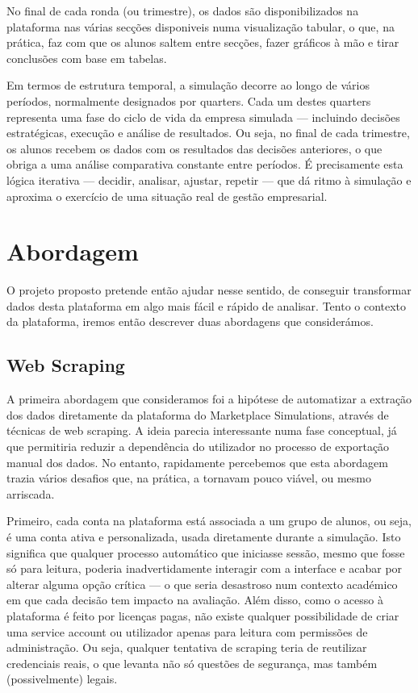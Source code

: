 No final de cada ronda (ou trimestre), os dados são disponibilizados na plataforma nas várias secções disponiveis numa visualização tabular, o que, na prática, faz com que os alunos saltem entre secções, fazer gráficos à mão e tirar conclusões com base em tabelas.

Em termos de estrutura temporal, a simulação decorre ao longo de vários períodos, normalmente designados por quarters. Cada um destes quarters representa uma fase do ciclo de vida da empresa simulada — incluindo decisões estratégicas, execução e análise de resultados. Ou seja, no final de cada trimestre, os alunos recebem os dados com os resultados das decisões anteriores, o que obriga a uma análise comparativa constante entre períodos. É precisamente esta lógica iterativa — decidir, analisar, ajustar, repetir — que dá ritmo à simulação e aproxima o exercício de uma situação real de gestão empresarial.


\section{Abordagem}
\label{sec:abordagem}

O projeto proposto pretende então ajudar nesse sentido, de conseguir transformar dados desta plataforma em algo mais fácil e rápido de analisar. Tento o contexto da plataforma, iremos então descrever duas abordagens que considerámos.

\subsection{Web Scraping}
A primeira abordagem que consideramos foi a hipótese de automatizar a extração dos dados diretamente da plataforma do Marketplace Simulations, através de técnicas de web scraping. A ideia parecia interessante numa fase conceptual, já que permitiria reduzir a dependência do utilizador no processo de exportação manual dos dados. No entanto, rapidamente percebemos que esta abordagem trazia vários desafios que, na prática, a tornavam pouco viável, ou mesmo arriscada.

Primeiro, cada conta na plataforma está associada a um grupo de alunos, ou seja, é uma conta ativa e personalizada, usada diretamente durante a simulação. Isto significa que qualquer processo automático que iniciasse sessão, mesmo que fosse só para leitura, poderia inadvertidamente interagir com a interface e acabar por alterar alguma opção crítica — o que seria desastroso num contexto académico em que cada decisão tem impacto na avaliação. Além disso, como o acesso à plataforma é feito por licenças pagas, não existe qualquer possibilidade de criar uma service account ou utilizador apenas para leitura com permissões de administração. Ou seja, qualquer tentativa de scraping teria de reutilizar credenciais reais, o que levanta não só questões de segurança, mas também (possivelmente) legais.  

